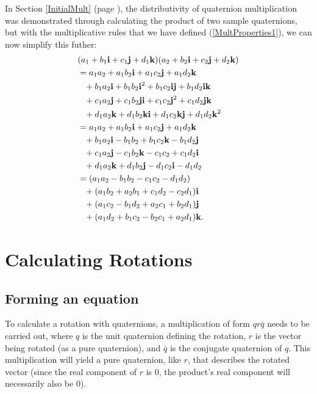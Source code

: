 \documentclass[10pt]{article}
\begin{document}
In Section \ref{InitialMult} (page \pageref{InitialMult}), the distributivity of quaternion multiplication was demonstrated through calculating the product of two sample quaternions, but with the multiplicative rules that we have defined (\ref{MultProperties1}), we can now simplify this futher:
\begin{equation}
    \begin{aligned}
        & (a_1 + b_1\vb{i} + c_1\vb{j} + d_1\vb{k})(a_2 + b_2\vb{i} + c_2\vb{j} + d_2\vb{k}) \\
        & = a_1a_2 + a_1b_2\vb{i} + a_1c_2\vb{j} + a_1d_2\vb{k} \\
        & \phantom{=} + b_1a_2\vb{i} + b_1b_2\vb{i}^2 + b_1c_2\vb{i}\vb{j} + b_1d_2\vb{i}\vb{k} \\
        & \phantom{=} + c_1a_2\vb{j} + c_1b_2\vb{j}\vb{i} + c_1c_2\vb{j}^2 + c_1d_2\vb{j}\vb{k} \\
        & \phantom{=} + d_1a_2\vb{k} + d_1b_2\vb{k}\vb{i} + d_1c_2\vb{k}\vb{j} + d_1d_2\vb{k}^2 \\
        & = a_1a_2 + a_1b_2\vb{i} + a_1c_2\vb{j} + a_1d_2\vb{k} \\
        & \phantom{=} + b_1a_2\vb{i} - b_1b_2 + b_1c_2\vb{k} - b_1d_2\vb{j} \\
        & \phantom{=} + c_1a_2\vb{j} - c_1b_2\vb{k} - c_1c_2 + c_1d_2\vb{i} \\
        & \phantom{=} + d_1a_2\vb{k} + d_1b_2\vb{j} - d_1c_2\vb{i} - d_1d_2  \\
        & = (a_1a_2 - b_1b_2 - c_1c_2 - d_1d_2) \\
        & \phantom{=} + (a_1b_2 + a_2b_1 + c_1d_2 - c_2d_1)\vb{i} \\
        & \phantom{=} + (a_1c_2 - b_1d_2 + a_2c_1 + b_2d_1)\vb{j} \\
        & \phantom{=} + (a_1d_2 + b_1c_2 - b_2c_1 + a_2d_1)\vb{k}.
    \end{aligned}
\end{equation}

\pagebreak
\section{Calculating Rotations}

\subsection{Forming an equation} \label{qrqIntro}

To calculate a rotation with quaternions, a multiplication of form $qr\bar{q}$ \cite{DRose} needs to be carried out, where $q$ is the unit quaternion defining the rotation, $r$ is the vector being rotated (as a pure quaternion), and $\bar{q}$ is the conjugate quaternion of $q$. This multiplication will yield a pure quaternion, like $r$, that describes the rotated vector (since the real component of $r$ is 0, the product's real component will necessarily also be 0).
\end{document}
